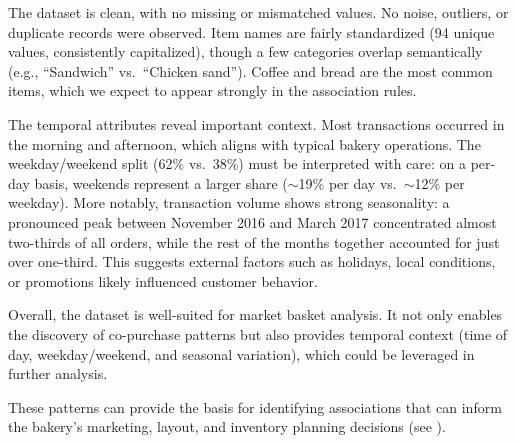 The dataset is clean, with no missing or mismatched values.  
No noise, outliers, or duplicate records were observed.  
Item names are fairly standardized (94 unique values, consistently capitalized), 
though a few categories overlap semantically (e.g., ``Sandwich'' vs.\ ``Chicken sand'').  
Coffee and bread are the most common items, 
which we expect to appear strongly in the association rules.  

The temporal attributes reveal important context.  
Most transactions occurred in the morning and afternoon, which aligns with 
typical bakery operations.  
The weekday/weekend split (62\% vs.\ 38\%) must be interpreted with care: 
on a per-day basis, weekends represent a larger share 
($\sim$19\% per day vs.\ $\sim$12\% per weekday).  
More notably, transaction volume shows strong seasonality: 
a pronounced peak between November 2016 and March 2017 
concentrated almost two-thirds of all orders, 
while the rest of the months together accounted for just over one-third.  
This suggests external factors such as holidays, local conditions, 
or promotions likely influenced customer behavior.  

Overall, the dataset is well-suited for market basket analysis.  
It not only enables the discovery of co-purchase patterns 
but also provides temporal context (time of day, weekday/weekend, 
and seasonal variation), which could be leveraged in further analysis. 

These patterns can provide the basis for identifying associations that can inform 
the bakery's marketing, layout, and inventory planning decisions 
(see ).
